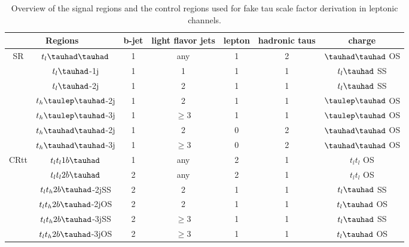 \begin{table}
\centering
\caption{Overview of the signal regions and the control regions used for fake tau scale factor derivation in leptonic channels.}
\label{tab:srcr}
\begin{tabular}[h]{c|c|c|c|c|c|c}
\hline \hline
\multicolumn{2}{c|}{Regions} & b-jet & light flavor jets        & lepton & hadronic taus & charge\\ \hline
\multirow{7}{*}{SR}&$t_l\thadhad$     & 1     & any                                & 1      & 2             & $\thadhad$ OS\\ \cline{2-7}
&$t_l\tauhad$-1j  & 1     & 1                                   & 1      & 1                     & $t_l\tauhad$ SS\\ \cline{2-7}
&$t_l\tauhad$-2j  & 1     & 2                                        & 1      & 1                     & $t_l\tauhad$ SS\\ \cline{2-7}
&$t_h\tlhad$-2j   & 1     & 2                           & 1      & 1             & $\tlhad$ OS\\ \cline{2-7}
&$t_h\tlhad$-3j   & 1     & $\ge3$                      & 1      & 1             & $\tlhad$ OS\\ \cline{2-7}
&$t_h\thadhad$-2j & 1     & 2                            & 0      & 2             & $\thadhad$ OS\\ \cline{2-7}
&$t_h\thadhad$-3j & 1     & $\ge3$                       & 0      & 2             & $\thadhad$ OS\\ \hline
\multirow{6}{*}{CRtt}&$t_lt_l1b\tauhad$ & 1     & any                           & 2      & 1                     & $t_lt_l$ OS\\ \cline{2-7}
&$t_lt_l2b\tauhad$      & 2     & any                           & 2      & 1                     & $t_lt_l$ OS\\ \cline{2-7}
&$t_lt_h2b\tauhad$-2jSS & 2     & 2                             & 1      & 1             & $t_l\tauhad$ SS\\ \cline{2-7}
&$t_lt_h2b\tauhad$-2jOS & 2     & 2                             & 1      & 1             & $t_l\tauhad$ OS\\ \cline{2-7}
&$t_lt_h2b\tauhad$-3jSS & 2     & $\ge3$                        & 1      & 1             & $t_l\tauhad$ SS\\ \cline{2-7}
&$t_lt_h2b\tauhad$-3jOS & 2     & $\ge3$                & 1      & 1             & $t_l\tauhad$ OS\\ \hline
\end{tabular}
\end{table}


